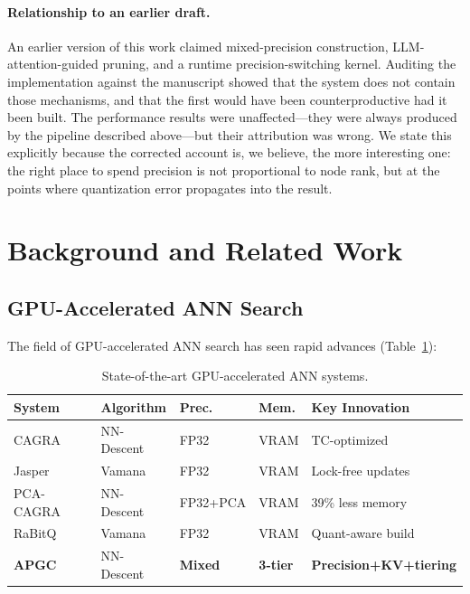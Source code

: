 \documentclass[11pt,twocolumn]{article}
\begin{document}
\paragraph{Relationship to an earlier draft.} An earlier version of this work
claimed mixed-precision construction, LLM-attention-guided pruning, and a
runtime precision-switching kernel. Auditing the implementation against the
manuscript showed that the system does not contain those mechanisms, and that
the first would have been counterproductive had it been built. The performance
results were unaffected---they were always produced by the pipeline described
above---but their attribution was wrong. We state this explicitly because the
corrected account is, we believe, the more interesting one: the right place to
spend precision is not proportional to node rank, but at the points where
quantization error propagates into the result.

\section{Background and Related Work}
\label{sec:related}

\subsection{GPU-Accelerated ANN Search}

The field of GPU-accelerated ANN search has seen rapid advances (Table~\ref{tab:sota}):

\begin{table}[ht]
\centering
\caption{State-of-the-art GPU-accelerated ANN systems.}
\label{tab:sota}
\small
\begin{tabular}{p{1.5cm}p{1.5cm}p{1cm}p{1cm}p{1.8cm}}
\toprule
\textbf{System} & \textbf{Algorithm} & \textbf{Prec.} & \textbf{Mem.} & \textbf{Key Innovation} \\
\midrule
CAGRA~\cite{ootomo2024cagra} & NN-Descent & FP32 & VRAM & TC-optimized \\
Jasper~\cite{jasper2026} & Vamana & FP32 & VRAM & Lock-free updates \\
PCA-CAGRA~\cite{pca2026} & NN-Descent & FP32+PCA & VRAM & 39\% less memory \\
RaBitQ~\cite{rabitq2026} & Vamana & FP32 & VRAM & Quant-aware build \\
\textbf{APGC} & NN-Descent & \textbf{Mixed} & \textbf{3-tier} & \textbf{Precision+KV+tiering} \\
\bottomrule
\end{tabular}
\end{table}
\end{document}

